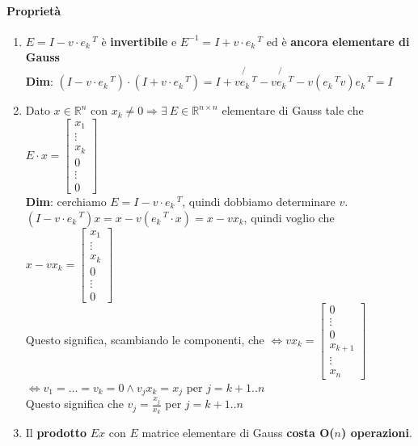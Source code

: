 \documentclass[10pt]{book}
\begin{document}
\paragraph{Proprietà}
\begin{enumerate}
	\item $E = I - v\cdot e_k\,^T$ è \textbf{invertibile} e $E^{-1} = I + v\cdot e_k\,^T$ ed è \textbf{ancora elementare di Gauss}\\
	\textbf{Dim}: $(I - v\cdot e_k\,^T)\cdot(I + v\cdot e_k\,^T) = I + \not{v e_k\,^T} - \not{v e_k\,^T} - v(e_k\,^T v)e_k\,^T = I$
	\item Dato $x \in \mathbb{R}^n$ con $x_k \neq 0 \Rightarrow \exists\: E \in \mathbb{R}^{n \times n}$ elementare di Gauss tale che
	\begin{math}
		E\cdot x = \left[ \begin{array}{c}
		x_1\\\vdots\\x_k\\0\\\vdots\\0
		\end{array} \right]	
	\end{math}\\
	\textbf{Dim}: cerchiamo $E = I - v\cdot e_k\,^T$, quindi dobbiamo determinare $v$.\\
	$(I - v\cdot e_k\,^T)x = x - v(e_k\,^T\cdot x) = x - v x_k$, quindi voglio che $x - v x_k = \left[ \begin{array}{c}
	x_1\\\vdots\\x_k\\0\\\vdots\\0
\end{array} \right]$\\
	Questo significa, scambiando le componenti, che $\Leftrightarrow v x_k = \left[ \begin{array}{c}
	0\\\vdots\\0\\x_{k+1}\\\vdots\\x_n
\end{array} \right]$\\
	$\Leftrightarrow v_1 = \ldots = v_k = 0 \wedge v_j x_k = x_j$ per $j = k+1..n$\\
	 Questo significa che $v_j = \frac{x_j}{x_k}$ per $j = k+1..n$
	 \item Il \textbf{prodotto} $E x$ con $E$ matrice elementare di Gauss \textbf{costa O($n$) operazioni}.\\

\end{enumerate}
\end{document}
